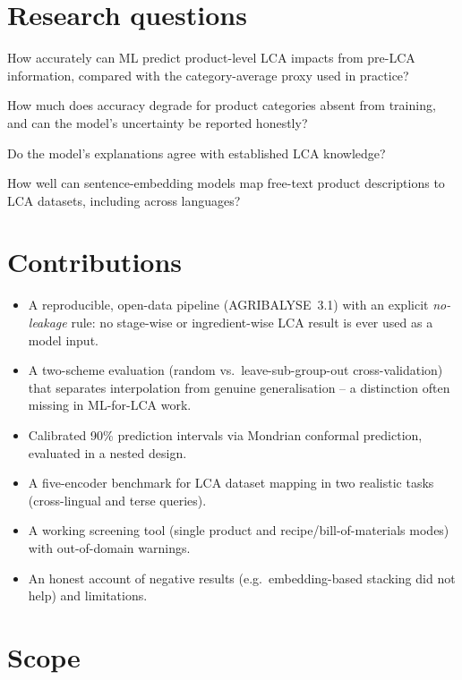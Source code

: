 \section{Research questions}

\begin{description}[style=nextline,leftmargin=1.2cm]
  \item[RQ1] How accurately can ML predict product-level LCA impacts from pre-LCA information,
  compared with the category-average proxy used in practice?
  \item[RQ2] How much does accuracy degrade for product categories absent from training, and can
  the model's uncertainty be reported honestly?
  \item[RQ3] Do the model's explanations agree with established LCA knowledge?
  \item[RQ4] How well can sentence-embedding models map free-text product descriptions to LCA
  datasets, including across languages?
\end{description}

\section{Contributions}

\begin{itemize}
  \item A reproducible, open-data pipeline (AGRIBALYSE~3.1) with an explicit \emph{no-leakage}
        rule: no stage-wise or ingredient-wise LCA result is ever used as a model input.
  \item A two-scheme evaluation (random vs.\ leave-sub-group-out cross-validation) that separates
        interpolation from genuine generalisation -- a distinction often missing in ML-for-LCA work.
  \item Calibrated 90\% prediction intervals via Mondrian conformal prediction, evaluated in a
        nested design.
  \item A five-encoder benchmark for LCA dataset mapping in two realistic tasks (cross-lingual and
        terse queries).
  \item A working screening tool (single product and recipe/bill-of-materials modes) with
        out-of-domain warnings.
  \item An honest account of negative results (e.g.\ embedding-based stacking did not help) and
        limitations.
\end{itemize}

\section{Scope}


